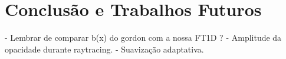 
\chapter{Conclusão e Trabalhos Futuros}
\label{ch:conclusion}
	- Lembrar de comparar b(x) do gordon com a nossa FT1D ?
	- Amplitude da opacidade durante raytracing.
	- Suavização adaptativa.